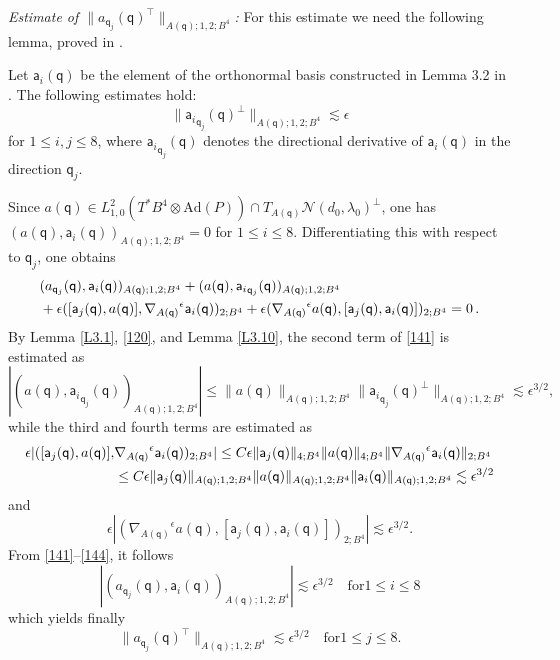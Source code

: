 \documentclass[11pt]{article}
\numberwithin{equation}{section} \setlength{\topmargin}{-35pt}
\newcommand{\Ad}{\text{Ad}}
\newcommand{\q}{\mathsf{q}}
\newcommand{\A}{\mathsf{a}}
\begin{document}
\medskip\noindent \textit{Estimate of $\|a_{\q_j}(\q)^{\intercal}\|_{A(\q);1,2;B^4}$:}
For this estimate we need the following lemma, proved in \cite{IM3}.
\begin{lemma} \label{L3.10} Let $\A_i(\q)$ be the element of the orthonormal basis constructed in Lemma 3.2 in \cite{IM3}.
The following estimates hold:
\begin{equation}
\label{140}
\|{\A_i}_{\q_j}(\q)^{\perp}\|_{A(\q);1,2;B^4}\lesssim\epsilon
\end{equation}
for $1\le i,j\le 8$, where ${\A_i}_{\q_j}(\q)$ denotes the
directional derivative of $\A_i(\q)$ in the direction $\q_j$.
\end{lemma}
Since $a(\q)\in L^2_{1,0}(T^{\ast}B^4\otimes\Ad(P))\cap
T_{A(\q)}\mathcal{N}(d_0,\lambda_0)^{\perp}$, one has
$(a(\q),\A_i(\q))_{A(\q);1,2;B^4}=0$ for $1\le i\le 8$.
Differentiating this with respect to $\q_j$, one obtains
\begin{align}
\label{141}
&(a_{\q_j}(\q),\A_i(\q))_{A(\q);1,2;B^4}+(a(\q),{\A_i}_{\q_j}(\q))_{A(\q);1,2;B^4}\notag\\
&+\epsilon([\A_j(\q),a(\q)],{\nabla_{A(\q)}}^{\epsilon}\A_i(\q))_{2;B^4}+
\epsilon({\nabla_{A(\q)}}^{\epsilon}a(\q),[\A_j(\q),\A_i(\q)])_{2;B^4}=0\,.
\end{align}
By Lemma \ref{L3.1}, \eqref{120}, and Lemma \ref{L3.10}, the second
term of \eqref{141} is estimated as
\begin{equation}
|(a(\q),{\A_i}_{\q_j}(\q))_{A(\q);1,2;B^4}|\le\|a(\q)\|_{A(\q);1,2;B^4}\|{\A_i}_{\q_j}(\q)^{\perp}\|_{A(\q);1,2;B^4}
\lesssim\epsilon^{3/2},
\end{equation}
while the third and fourth terms are estimated as
\begin{align}
\epsilon|([\A_j(\q),a(\q)],&{\nabla_{A(\q)}}^{\epsilon}\A_i(\q))_{2;B^4}|\le C\epsilon\|\A_j(\q)\|_{4;B^4}\|a(\q)\|_{4;B^4}\|{\nabla_{A(\q)}}^{\epsilon}\A_i(\q)\|_{2;B^4}\notag\\
&\le
C\epsilon\|\A_j(\q)\|_{A(\q);1,2;B^4}\|a(\q)\|_{A(\q);1,2;B^4}\|\A_i(\q)\|_{A(\q);1,2;B^4}
\lesssim\epsilon^{3/2}
\end{align}
and
\begin{equation}
\label{144}
\epsilon|({\nabla_{A(\q)}}^{\epsilon}a(\q),[\A_j(\q),\A_i(\q)])_{2;B^4}|\lesssim\epsilon^{3/2}.
\end{equation}
From \eqref{141}--\eqref{144}, it follows
\begin{equation}
|(a_{\q_j}(\q),\A_i(\q))_{A(\q);1,2;B^4}|\lesssim\epsilon^{3/2}\quad\text{for
$1\le i\le 8$}
\end{equation}
 which yields finally
\begin{equation}
\label{146}
\|a_{\q_j}(\q)^{\intercal}\|_{A(\q);1,2;B^4}\lesssim\epsilon^{3/2}\quad\text{for
$1\le j\le 8$}.
\end{equation}
\end{document}
